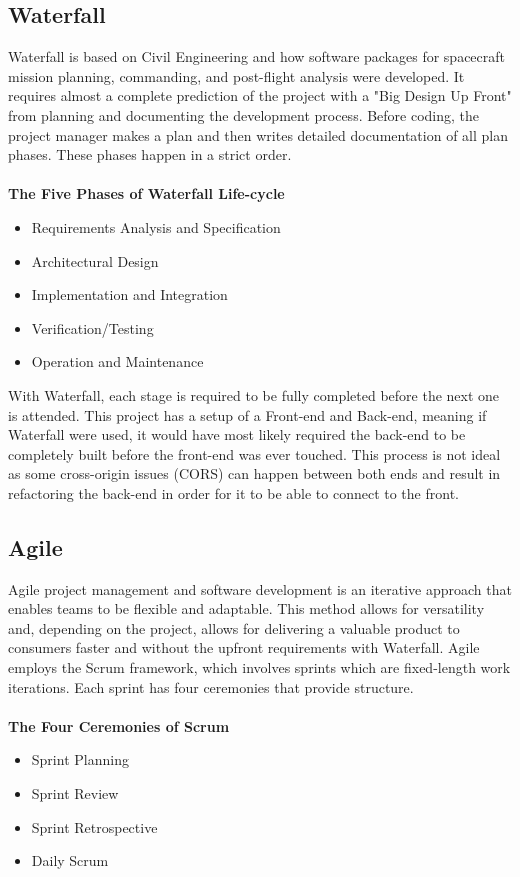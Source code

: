 \subsection{Waterfall}
Waterfall is based on Civil Engineering and how software packages for spacecraft mission planning, commanding, and post-flight analysis were developed. \cite{ref2} It requires almost a complete prediction of the project with a "Big Design Up Front" from planning and documenting the development process. Before coding, the project manager makes a plan and then writes detailed documentation of all plan phases. These phases happen in a strict order. \cite{ref3}
\\\\ \textbf{The Five Phases of Waterfall Life-cycle}
\begin{itemize}
    \item Requirements Analysis and Specification
    \item Architectural Design
    \item Implementation and Integration
    \item Verification/Testing
    \item Operation and Maintenance
\end{itemize}

With Waterfall, each stage is required to be fully completed before the next one is attended. This project has a setup of a Front-end and Back-end, meaning if Waterfall were used, it would have most likely required the back-end to be completely built before the front-end was ever touched. This process is not ideal as some cross-origin issues (CORS) can happen between both ends and result in refactoring the back-end in order for it to be able to connect to the front.

\subsection{Agile}
Agile project management and software development is an iterative approach that enables teams to be flexible and adaptable. This method allows for versatility and, depending on the project, allows for delivering a valuable product to consumers faster and without the upfront requirements with Waterfall. Agile employs the Scrum framework, which involves sprints which are fixed-length work iterations. Each sprint has four ceremonies that provide structure. \cite{ref4}
\\\\ \textbf{The Four Ceremonies of Scrum}
\begin{itemize}
    \item Sprint Planning
    \item Sprint Review
    \item Sprint Retrospective
    \item Daily Scrum
\end{itemize}


